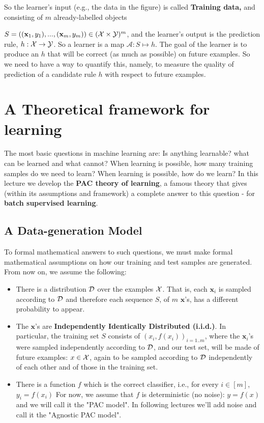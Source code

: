 So the learner's input (e.g., the data in the figure) is called \textbf{Training data,} and consisting of $m$ already-labelled objects {$S=((\mathbf{x}_1,y_1),...,(\mathbf{x}_m,y_m)) \in  (\mathcal{X}\times \mathcal{Y})^m$, and the learner's output is the prediction rule, $h:\mathcal{X}\to \mathcal{Y}$. So a learner is a map $\mathcal{A}:S\mapsto h$. The goal of the learner is to produce an $h$ that will be correct (as much as possible) on future examples.  So we need to have a way to quantify this, namely, to measure the quality of prediction of a candidate rule  $h$ with respect to future examples. 

\section{A Theoretical framework for learning}

The most basic questions in machine learning are: Is anything learnable? what
can be learned and what cannot? When learning is possible, how many training
samples do we need to learn? When learning is possible, how do we learn? In this lecture we develop the {\bf PAC theory of
learning}, a famous theory that gives (within its assumptions and framework) a complete
answer to this question - for {\bf batch  supervised learning}. 

\subsection{A Data-generation Model }
To formal mathematical answers to such questions, we must make formal
mathematical assumptions on how our training and test samples are generated.
From now on, we assume the following:
\begin{itemize}
  \item There is a distribution $\mathcal{D}$ over the examples $\mathcal{X}$.  That is, each $\mathbf{x}_i$ is sampled according to $\mathcal{D}$ and therefore each sequence $S$, of $m$ $\mathbf{x}$'s, has a different probability to appear.
  \item The $\mathbf{x}$'s are \textbf{Independently Identically Distributed (i.i.d.)}.
  In particular, the training set $S$ consists of $(x_i,f(x_i))_{i=1.. m}$, where the $\mathbf{x}_i$'s were sampled independently according to $\mathcal{D}$, and our test set, will be made of future examples: $x\in\mathcal{X}$, again to be  sampled according to $\mathcal{D}$ independently of each other and of those in the training set.
  \item There is a function $f$ which is the correct classifier, i.e., for every $i \in [m]$, $y_i = f(x_i)$
  For now, we assume that $f$ is deterministic (no noise): $y=f(x)$ and we will call it the "PAC model". 
  In following lectures we'll add noise and call it the "Agnostic PAC model".
\end{itemize}

}
